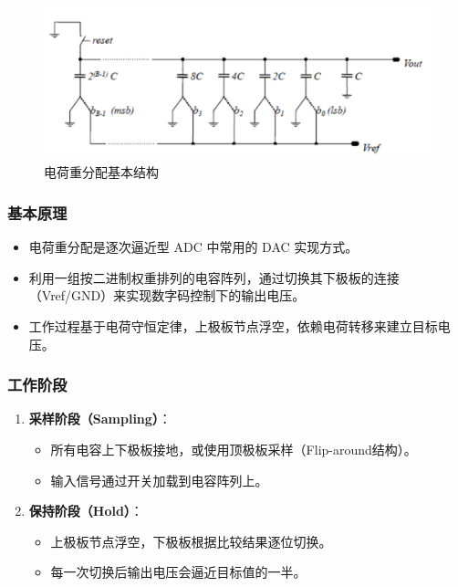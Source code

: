 \documentclass[cs4size,a4paper]{ctexart}
\numberwithin{equation}{section}
\numberwithin{table}{section}
\numberwithin{figure}{section}
\begin{document}
			\begin{figure}[H]
				\centering
				\includegraphics[width=1\textwidth]{figure/cap.png}
				\caption{电荷重分配基本结构} \label{fig:cap}
			\end{figure}
			
			\subsubsection{基本原理}
			\begin{itemize}
				\item 电荷重分配是逐次逼近型 ADC 中常用的 DAC 实现方式。
				\item 利用一组按二进制权重排列的电容阵列，通过切换其下极板的连接（Vref/GND）来实现数字码控制下的输出电压。
				\item 工作过程基于电荷守恒定律，上极板节点浮空，依赖电荷转移来建立目标电压。
			\end{itemize}
			
			\subsubsection{工作阶段}
			\begin{enumerate}
				\item \textbf{采样阶段（Sampling）}：
				\begin{itemize}
					\item 所有电容上下极板接地，或使用顶极板采样（Flip-around结构）。
					\item 输入信号通过开关加载到电容阵列上。
				\end{itemize}
				\item \textbf{保持阶段（Hold）}：
				\begin{itemize}
					\item 上极板节点浮空，下极板根据比较结果逐位切换。
					\item 每一次切换后输出电压会逼近目标值的一半。
				\end{itemize}
			\end{enumerate}
			
\end{document}

